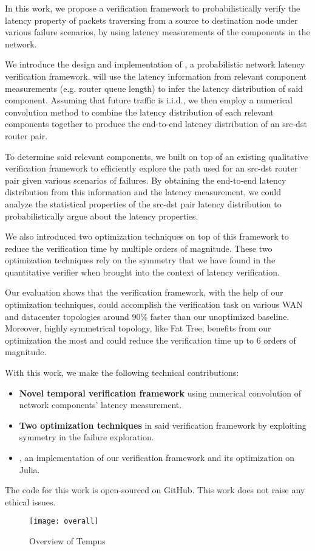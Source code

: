 In this work, we propose a verification framework to probabilistically verify the latency property of packets 
traversing from a source to destination node under various failure scenarios, by using latency 
measurements of the components in the network.

We introduce the design and implementation of \tool, a probabilistic network latency verification 
framework.
\tool will use the latency information from relevant component measurements (e.g. router queue length) 
to infer the latency distribution of said component.
Assuming that future traffic is i.i.d., we then employ a numerical convolution method to combine the
latency distribution of each relevant components together to produce the end-to-end latency distribution 
of an src-dst router pair. 

To determine said relevant components, we built \tool on top of an existing qualitative verification 
framework to efficiently explore the path used for an src-dst router pair given various scenarios of 
failures.
By obtaining the end-to-end latency distribution from this information and the latency measurement, 
we could analyze the statistical properties of the src-dst pair latency distribution to probabilistically 
argue about the latency properties.

We also introduced two optimization techniques on top of this framework to reduce the verification time 
by multiple orders of magnitude.
These two optimization techniques rely on the symmetry that we have found in the quantitative verifier 
when brought into the context of latency verification.

Our evaluation shows that the verification framework, with the help of our optimization techniques, 
could accomplish the verification task on various WAN and datacenter topologies around 90\% faster than 
our unoptimized baseline.
Moreover, highly symmetrical topology, like Fat Tree, benefits from our optimization the most 
and could reduce the verification time up to 6 orders of magnitude.

With this work, we make the following technical contributions:
\begin{itemize}
    \item \textbf{Novel temporal verification framework} using numerical convolution of network 
        components' latency measurement.
    \item \textbf{Two optimization techniques} in said verification framework by exploiting 
        symmetry in the failure exploration.
    \item \textbf{\tool}, an implementation of our verification framework and its optimization 
        on Julia.
\end{itemize}

The code for this work is open-sourced on GitHub. %
This work does not raise any ethical issues.

\begin{figure*}[h]
    \centering
    \texttt{[image: overall]}
    \caption{Overview of Tempus}
    \label{fig:process}
\end{figure*}